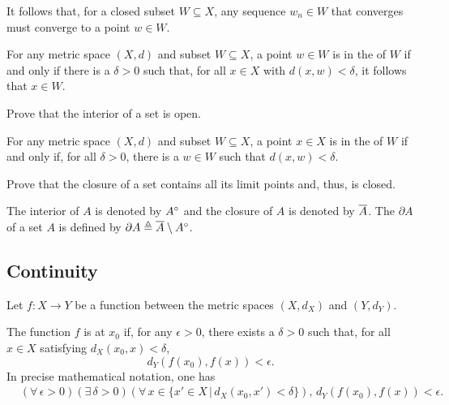 It follows that, for a closed subset $W \subseteq X$, any sequence $w_n \in W$ that converges must converge to a point $w \in W$.

\begin{definition}
For any metric space $(X,d)$ and subset $W \subseteq X$, a point $w\in W$ is in the  of $W$ if and only if there is a $\delta >0$ such that, for all $x\in X$ with $d(x,w)<\delta$, it follows that $x\in W$.
\end{definition}

\begin{problem}
Prove that the interior of a set is open.
\end{problem}

\begin{definition}
For any metric space $(X,d)$ and subset $W \subseteq X$, a point $x\in X$ is in the  of $W$ if and only if, for all $\delta >0$, there is a $w\in W$ such that $d(x,w)<\delta$.
\end{definition}

\begin{problem}
Prove that the closure of a set contains all its limit points and, thus, is closed.
\end{problem}

The interior of $A$ is denoted by ${A}^{\circ}$ and the closure of $A$ is denoted by $\overline{A}$.
The  $\partial A$ of a set $A$ is defined by $\partial A \triangleq \overline{A} \setminus {A}^{\circ}$.

\subsection{Continuity}

Let $f \colon X \rightarrow Y$ be a function between the metric spaces $(X,d_X)$ and $(Y,d_Y)$.
\begin{definition}
The function $f$ is  at $x_0$ if, for any $\epsilon> 0$, there exists a $\delta >0$ such that, for all $x\in X$ satisfying $d_X(x_0,x)< \delta$, 
\[ d_Y \left( f(x_0),f(x) \right) < \epsilon .\]
In precise mathematical notation, one has
\begin{equation*}
\begin{split}
&(\forall \, \epsilon >0) ( \exists \, \delta >0)(\forall \, x \in \{x'\in X\,|\,d_X (x_0,x')<\delta\}),  \, d_Y \left( f(x_0),f(x) \right) < \epsilon .
\end{split}
\end{equation*}
\end{definition}

